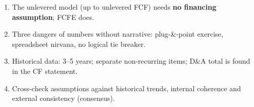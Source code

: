 \begin{trapbox}
\begin{enumerate}[leftmargin=*]
  \item The unlevered model (up to unlevered FCF) needs \textbf{no financing assumption}; FCFE does.
  \item Three dangers of numbers without narrative: plug-\&-point exercise, spreadsheet nirvana, no logical tie breaker.
  \item Historical data: 3--5 years; separate non-recurring items; D\&A total is found in the CF statement.
  \item Cross-check assumptions against historical trends, internal coherence and external consistency (consensus).
\end{enumerate}
\end{trapbox}
